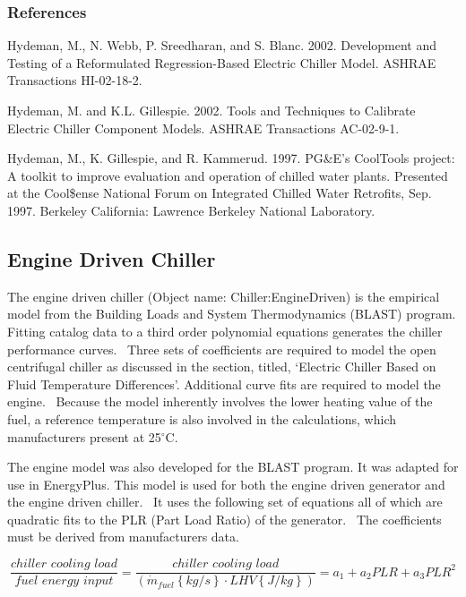 \subsubsection{References}\label{references-1-003}

Hydeman, M., N. Webb, P. Sreedharan, and S. Blanc. 2002. Development and Testing of a Reformulated Regression-Based Electric Chiller Model. ASHRAE Transactions HI-02-18-2.

Hydeman, M. and K.L. Gillespie. 2002. Tools and Techniques to Calibrate Electric Chiller Component Models. ASHRAE Transactions AC-02-9-1.

Hydeman, M., K. Gillespie, and R. Kammerud. 1997. PG\&E's CoolTools project: A toolkit to improve evaluation and operation of chilled water plants. Presented at the Cool\$ense National Forum on Integrated Chilled Water Retrofits, Sep. 1997. Berkeley California: Lawrence Berkeley National Laboratory.

\subsection{Engine Driven Chiller}\label{engine-driven-chiller}

The engine driven chiller (Object name: Chiller:EngineDriven) is the empirical model from the Building Loads and System Thermodynamics (BLAST) program. Fitting catalog data to a third order polynomial equations generates the chiller performance curves.~ Three sets of coefficients are required to model the open centrifugal chiller as discussed in the section, titled, `Electric Chiller Based on Fluid Temperature Differences'. Additional curve fits are required to model the engine.~ Because the model inherently involves the lower heating value of the fuel, a reference temperature is also involved in the calculations, which manufacturers present at 25\(^{\circ}\)C.

The engine model was also developed for the BLAST program. It was adapted for use in EnergyPlus. This model is used for both the engine driven generator and the engine driven chiller.~ It uses the following set of equations all of which are quadratic fits to the PLR (Part Load Ratio) of the generator.~ The coefficients must be derived from manufacturers data.

\begin{equation}
\frac{{chiller\,\,cooling\,\,load}}{{fuel\,\,energy\,\,input}} = \frac{{chiller\,\,cooling\,\,load}}{{\left( {{{\dot m}_{fuel}}\left\{ {kg/s} \right\} \cdot LHV\left\{ {J/kg} \right\}} \right)}} = {a_1} + {a_2}PLR + {a_3}PL{R^2}
\end{equation}

